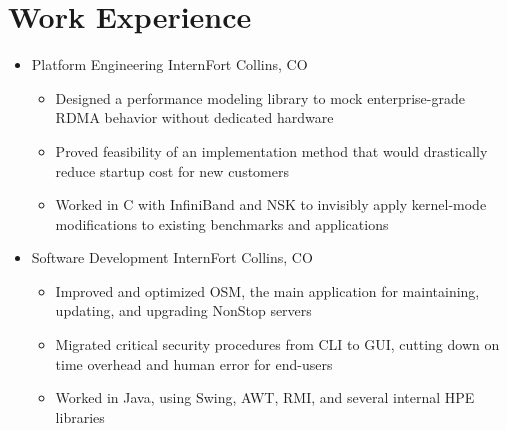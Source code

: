 \documentclass[10pt,letterpaper,sans]{moderncv}
\renewcommand{\_}{\textscale{.7}{\textunderscore}}
\newcommand{\+}{%
  \raisebox{\dimexpr(\fontcharht\font`X-\height+\depth)/2\relax}{+}%
}
\begin{document}
\section{Work Experience}
\begin{itemize}
\item{
  {Platform Engineering Intern}{Fort Collins, CO}{}{
    \begin{itemize}
    \item Designed a performance modeling library to mock enterprise-grade RDMA behavior without dedicated hardware
    \item Proved feasibility of an implementation method that would drastically reduce startup cost for new customers
    \item Worked in C with InfiniBand and NSK to invisibly apply kernel-mode modifications to existing benchmarks and applications
    \end{itemize}
}}
\item{
  {Software Development Intern}{Fort Collins, CO}{}{
    \begin{itemize}
    \item Improved and optimized OSM, the main application for maintaining, updating,
      and upgrading NonStop servers
    \item Migrated critical security procedures from CLI to GUI, cutting down on time
      overhead and human error for end-users
    \item Worked in Java, using Swing, AWT, RMI, and several internal HPE libraries
    \end{itemize}
}}
  \iftoggle{tech-corps}{
  \item{\cventry{Jul 2019 -- Aug 2019}{Tech Corps}{Programming Instructor}{Fort Collins, CO}{}{
      \begin{itemize}
      \item Lead multiple week long summer camps aimed at Middle and Elementary School students
      \item Prepared and delivered material covering programming fundamentals, theory,
        and applications
      \item Delivered lessons and projects in Scratch, MIT App Inventor, and Python
      \end{itemize}
  }}
  }{}
\end{itemize}
\end{document}
